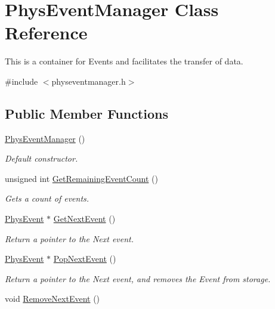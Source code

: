 \hypertarget{classPhysEventManager}{
\section{PhysEventManager Class Reference}
\label{d5/dd7/classPhysEventManager}
}


This is a container for Events and facilitates the transfer of data.  


{\ttfamily \#include $<$physeventmanager.h$>$}\subsection*{Public Member Functions}
\begin{DoxyCompactItemize}
\item 
\hyperlink{classPhysEventManager_a217e7f6006aaf5e08e2872fa4d66e5e2}{PhysEventManager} ()
\begin{DoxyCompactList}\small\item\em Default constructor. \item\end{DoxyCompactList}\item 
unsigned int \hyperlink{classPhysEventManager_ab14d238e7abe9919be8e2d9eef388b64}{GetRemainingEventCount} ()
\begin{DoxyCompactList}\small\item\em Gets a count of events. \item\end{DoxyCompactList}\item 
\hyperlink{classPhysEvent}{PhysEvent} $\ast$ \hyperlink{classPhysEventManager_a6de94bc6c23dcbd7e15785cadee2e80b}{GetNextEvent} ()
\begin{DoxyCompactList}\small\item\em Return a pointer to the Next event. \item\end{DoxyCompactList}\item 
\hyperlink{classPhysEvent}{PhysEvent} $\ast$ \hyperlink{classPhysEventManager_a3122b32172326ac32cfecc828b820977}{PopNextEvent} ()
\begin{DoxyCompactList}\small\item\em Return a pointer to the Next event, and removes the Event from storage. \item\end{DoxyCompactList}\item 
void \hyperlink{classPhysEventManager_ad040054bd9018ff0fd27ad78ec1e87fa}{RemoveNextEvent} ()

\end{DoxyCompactItemize}
